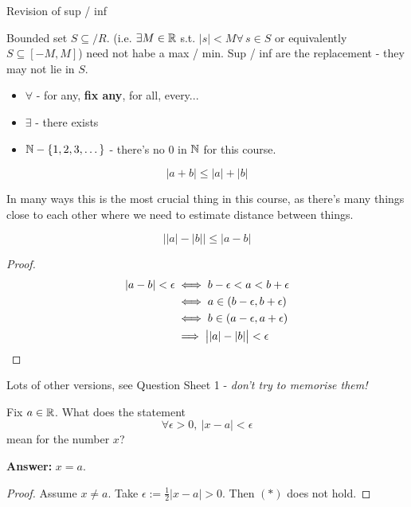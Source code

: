 \documentclass[10pt,twoside]{scrartcl}
\begin{document}
Revision of sup / inf

Bounded set $S \subseteq /R$. (i.e. $\exists M \in \mathbb{R}$ s.t. $|s| < M \forall\,s \in S$ or equivalently $S \subseteq [-M, M]$) need not habe a max / min. Sup / inf are the replacement - they may not lie in $S$.

\begin{itemize}
\item $\forall$ - for any, \textbf{fix any}, for all, every...
\item $\exists$ - there exists
\item $\mathbb{N} - \{1,2,3,\dots\}$ - there's no $0$ in $\mathbb{N}$ for this course.
\end{itemize}

\begin{theorem}
	\[|a+b| \leq |a| + |b|\]
\end{theorem}

In many ways this is the most crucial thing in this course, as there's many things close to each other where we need to estimate distance between things. 

\begin{corollary}
\[\left||a| - |b|\right|\leq |a-b|	\]
\end{corollary}
\begin{proof}
\begin{align*}
|a-b| < \epsilon &\iff b-\epsilon < a < b + \epsilon\\
&\iff a \in (b-\epsilon, b+\epsilon)\\
&\iff b \in (a-\epsilon, a+\epsilon)	\\
&\implies \left||a| - |b|\right|< \epsilon\qedhere
\end{align*} 
\end{proof}

Lots of other versions, see Question Sheet 1 - \emph{don't try to memorise them!}\\



\begin{clicker}
Fix $a \in\mathbb{R}$. What does the statement 
\[\forall \epsilon >0,~|x-a|<\epsilon \tag{$*$}\]
mean for the number $x$? 

\textbf{Answer:} $x = a$. 
\begin{proof}
Assume $x \neq a$. Take $\epsilon := \frac{1}{2}|x-a| > 0$. Then $(*)$ does not hold.	
\end{proof}

\end{clicker}
\end{document}
